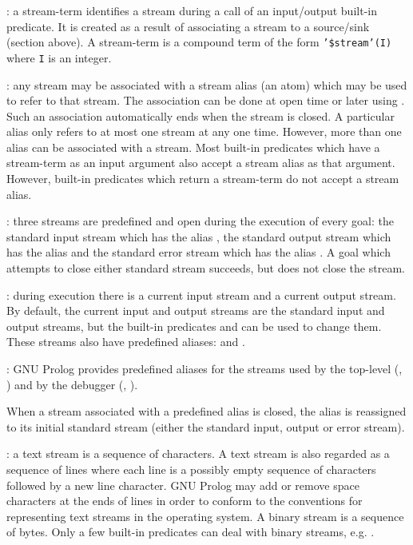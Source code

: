 : a stream-term identifies a stream during a call of an
input/output built-in predicate. It is created as a result of associating a
stream to a source/sink (section above). A stream-term is a compound term of
the form \texttt{'\$stream'(I)} where \texttt{I} is an integer.

: any stream may be associated with a stream alias
(an atom) which may be used to refer to that stream. The association
can be done at open time or later using 
. Such an association automatically ends when the
stream is closed. A particular alias only refers to at most one stream at any
one time. However, more than one alias can be associated with a stream. Most
built-in predicates which have a stream-term as an input argument also accept
a stream alias as that argument. However, built-in predicates which return a
stream-term do not accept a stream alias.

: three streams are predefined and open during the
execution of every goal: the standard input stream which has the alias
, the standard output stream which has the alias
 and the standard error stream which has the alias
. A goal which attempts to close either standard stream
succeeds, but does not close the stream.

: during execution there is a current input
stream and a current output stream. By default, the current input and
output streams are the standard input and output streams, but the
built-in predicates   and
  can be used to change
them. These streams also have predefined aliases: 
and . 

: GNU Prolog provides predefined
aliases for the streams used by the top-level
(, ) and by the
debugger (, ).

When a stream associated with a predefined alias is closed, the alias is
reassigned to its initial standard stream (either the standard input,
output or error stream).

: a text stream is a sequence of
characters. A text stream is also regarded as a sequence of lines where each
line is a possibly empty sequence of characters followed by a new line
character. GNU Prolog may add or remove space characters at the ends of lines
in order to conform to the conventions for representing text streams in the
operating system. A binary stream is a sequence of bytes. Only a few
built-in predicates can deal with binary streams, e.g.
 .

